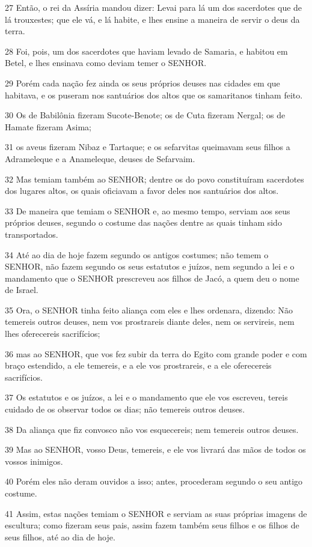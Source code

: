 \par 27 Então, o rei da Assíria mandou dizer: Levai para lá um dos sacerdotes que de lá trouxestes; que ele vá, e lá habite, e lhes ensine a maneira de servir o deus da terra.
\par 28 Foi, pois, um dos sacerdotes que haviam levado de Samaria, e habitou em Betel, e lhes ensinava como deviam temer o SENHOR.
\par 29 Porém cada nação fez ainda os seus próprios deuses nas cidades em que habitava, e os puseram nos santuários dos altos que os samaritanos tinham feito.
\par 30 Os de Babilônia fizeram Sucote-Benote; os de Cuta fizeram Nergal; os de Hamate fizeram Asima;
\par 31 os aveus fizeram Nibaz e Tartaque; e os sefarvitas queimavam seus filhos a Adrameleque e a Anameleque, deuses de Sefarvaim.
\par 32 Mas temiam também ao SENHOR; dentre os do povo constituíram sacerdotes dos lugares altos, os quais oficiavam a favor deles nos santuários dos altos.
\par 33 De maneira que temiam o SENHOR e, ao mesmo tempo, serviam aos seus próprios deuses, segundo o costume das nações dentre as quais tinham sido transportados.
\par 34 Até ao dia de hoje fazem segundo os antigos costumes; não temem o SENHOR, não fazem segundo os seus estatutos e juízos, nem segundo a lei e o mandamento que o SENHOR prescreveu aos filhos de Jacó, a quem deu o nome de Israel.
\par 35 Ora, o SENHOR tinha feito aliança com eles e lhes ordenara, dizendo: Não temereis outros deuses, nem vos prostrareis diante deles, nem os servireis, nem lhes oferecereis sacrifícios;
\par 36 mas ao SENHOR, que vos fez subir da terra do Egito com grande poder e com braço estendido, a ele temereis, e a ele vos prostrareis, e a ele oferecereis sacrifícios.
\par 37 Os estatutos e os juízos, a lei e o mandamento que ele vos escreveu, tereis cuidado de os observar todos os dias; não temereis outros deuses.
\par 38 Da aliança que fiz convosco não vos esquecereis; nem temereis outros deuses.
\par 39 Mas ao SENHOR, vosso Deus, temereis, e ele vos livrará das mãos de todos os vossos inimigos.
\par 40 Porém eles não deram ouvidos a isso; antes, procederam segundo o seu antigo costume.
\par 41 Assim, estas nações temiam o SENHOR e serviam as suas próprias imagens de escultura; como fizeram seus pais, assim fazem também seus filhos e os filhos de seus filhos, até ao dia de hoje.

